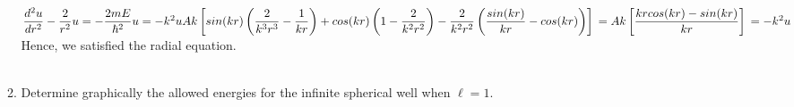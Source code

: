 \documentclass[fleqn]{article}
\begin{document}
\begin{enumerate}
\begin{enumerate}
{          \\
          $
            \dfrac{d^2 u}{dr^2}-\dfrac{2}{r^2} u=-\dfrac{2 m E}{\hbar^2}u=-k^2 u
            \\
            \\
            \\
            Ak \left[
              sin(kr)\left(\dfrac{2}{k^3 r^3}-\dfrac{1}{kr}\right)
              +cos(kr)\left(1-\dfrac{2}{k^2 r^2}\right)
              -\dfrac{2}{k^2 r^2}\left(\dfrac{sin(kr)}{kr}-cos(kr)\right)
            \right]
            \\
            \\
            \\
            =Ak \left[\dfrac{kr cos(kr)-sin(kr)}{kr}\right]
            \\
            \\
            \\
            =-k^2 u
            \\
            \\
          $
          Hence, we satisfied the radial equation.
          \\
          \\
        }

      \pagebreak

      \item Determine graphically the allowed energies for the infinite spherical well when $\ell=1$.


\end{enumerate}
\end{enumerate}
\end{document}
